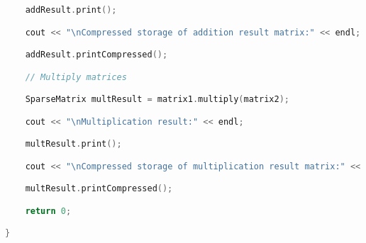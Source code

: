 \begin{lstlisting}[language=C++]
    addResult.print();

    cout << "\nCompressed storage of addition result matrix:" << endl;

    addResult.printCompressed();

    // Multiply matrices

    SparseMatrix multResult = matrix1.multiply(matrix2);

    cout << "\nMultiplication result:" << endl;

    multResult.print();

    cout << "\nCompressed storage of multiplication result matrix:" << endl;

    multResult.printCompressed();

    return 0;

}
\end{lstlisting}